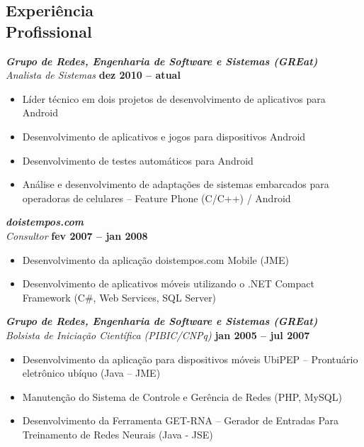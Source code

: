 \documentclass[margin, 10pt]{res} %
\begin{document}
\begin{resume}
 

 
\section{Experiência \\ Profissional}

{\sl\bf Grupo de Redes, Engenharia de Software e Sistemas (GREat)}  \\
{\sl Analista de Sistemas} \hfill {\bf dez 2010 -- atual}
\begin{itemize} \itemsep -2pt %
\item Líder técnico em dois projetos de desenvolvimento de aplicativos para Android
\item Desenvolvimento de aplicativos e jogos para dispositivos Android
\item Desenvolvimento de testes automáticos para Android
\item Análise e desenvolvimento de adaptações de sistemas embarcados para operadoras de celulares – Feature Phone (C/C++) / Android
\end{itemize}
 
{\sl\bf doistempos.com} \\
{\sl Consultor} \hfill {\bf fev 2007 -- jan 2008}
\begin{itemize} \itemsep -2pt 
\item Desenvolvimento da aplicação doistempos.com Mobile (JME)
\item Desenvolvimento de aplicativos móveis utilizando o .NET Compact Framework (C\#, Web Services, SQL Server)
\end{itemize} 


{\sl\bf Grupo de Redes, Engenharia de Software e Sistemas (GREat)}  \\
{\sl Bolsista de Iniciação Científica (PIBIC/CNPq)} \hfill {\bf jan 2005 -- jul 2007}
\begin{itemize} \itemsep -2pt %
\item Desenvolvimento da aplicação para dispositivos móveis UbiPEP – Prontuário eletrônico ubíquo (Java – JME)
\item Manutenção do Sistema de Controle e Gerência de Redes (PHP, MySQL)
\item Desenvolvimento da Ferramenta GET-RNA – Gerador de Entradas Para Treinamento de Redes Neurais (Java - JSE)
\end{itemize}


\end{resume}
\end{document}
